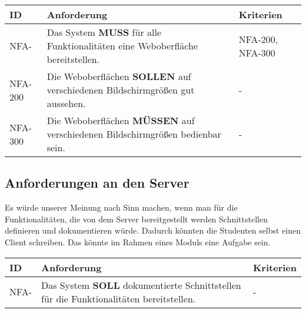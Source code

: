 \vspace{12pt}

\begin{tabular} {|p{}|p{11cm}|p{}|}
	\hline
	ID & Anforderung & Kriterien \\
	\hline
	NFA-
	& Das System \textbf{MUSS} für alle Funktionalitäten eine Weboberfläche bereitstellen. 
	& NFA-200, NFA-300 \\
	\hline
	NFA-200 
	& Die Weboberflächen \textbf{SOLLEN} auf verschiedenen Bildschirmgrößen gut aussehen.
	& -  \\
	\hline
	NFA-300
	& Die Weboberflächen \textbf{MÜSSEN} auf verschiedenen Bildschirmgrößen bedienbar sein.
	& - \\
	\hline
\end{tabular}

\newpage

\subsection{Anforderungen an den Server}
Es würde unserer Meinung nach Sinn machen, wenn man für die Funktionalitäten, die von dem Server bereitgestellt werden Schnittstellen definieren und dokumentieren würde. Dadurch könnten die Studenten selbst einen Client schreiben. Das könnte im Rahmen eines Moduls eine Aufgabe sein. 

\vspace{12pt}

\begin{tabular} {|p{}|p{11cm}|p{}|}
	\hline
	ID & Anforderung & Kriterien \\
	\hline
	NFA- 
	& Das System \textbf{SOLL} dokumentierte Schnittstellen für die Funktionalitäten bereitstellen.
	& - \\
	\hline
\end{tabular}